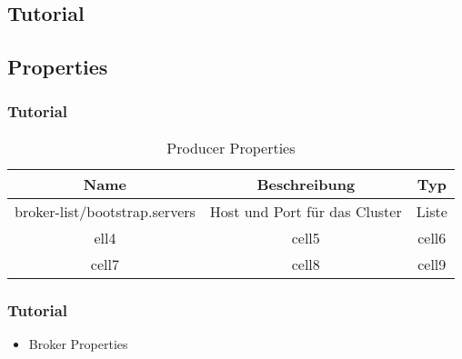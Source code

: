 \begin{frame}[fragile]
\section{Tutorial}
\subsection{Properties}
\frametitle{Tutorial}

\begin{table}[h!]
\centering
\begin{tabular}{ |c|c|c| } 
\hline 
Name & Beschreibung & Typ \\ \hline \hline
broker-list/bootstrap.servers & Host und Port für das Cluster & Liste \\ \hline
ell4 & cell5 & cell6 \\ 
cell7 & cell8 & cell9 \\ 
\hline
\end{tabular}
\caption{Producer Properties}
\label{producer_prop}
\end{table}

\end{frame}

\begin{frame}[fragile]
\frametitle{Tutorial}
\begin{itemize}
\item Broker Properties~\cite{KafkaPropBroker}
\end{itemize}
\end{frame}